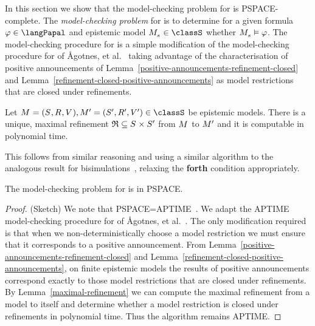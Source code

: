 In this section we show that the model-checking problem for \logicPapalS{} is PSPACE-complete.
The {\em model-checking problem} for \logicPapalS{} is to determine for a given formula $\phi \in \langPapal$ and epistemic model $\kPModel{\kStateS} \in \classS$ whether $\kPModel{\kStateS} \entails \phi$.
The model-checking procedure for \logicPapalS{} is a simple modification of the model-checking procedure for \logicApalS{} of Ågotnes, et al.~\cite{agotnesetal.jal:2010} taking advantage of the characterisation of positive announcements of Lemma~\ref{positive-announcements-refinement-closed} and Lemma~\ref{refinement-closed-positive-announcements} as model restrictions that are closed under refinements.

\begin{lemma}\label{maximal-refinement}
    Let $\kModelAndTuple, \kModelAndTuple[\prime] \in \classS$ be epistemic models.
    There is a unique, maximal refinement $\refinement \subseteq \kStates \times \kStates[\prime]$ from $\kModel$ to $\kModel[\prime]$ and it is computable in polynomial time.
\end{lemma}

This follows from similar reasoning and using a similar algorithm to the analogous result for bisimulations~\cite{gorankootto:2006}, relaxing the {\bf forth} condition appropriately.

\begin{theorem}\label{papal-model-checking-pspace}
    The model-checking problem for \logicPapalS{} is in PSPACE.
\end{theorem}

\begin{proof}{(Sketch)}
    We note that PSPACE=APTIME~\cite{CKS81}.
    We adapt the APTIME model-checking procedure for \logicApalS{} of Ågotnes, et al.~\cite{agotnesetal.jal:2010}.
    The only modification required is that when we non-deterministically choose a model restriction we must ensure that it corresponds to a positive announcement.
    From Lemma~\ref{positive-announcements-refinement-closed} and Lemma~\ref{refinement-closed-positive-announcements}, on finite epistemic models the results of positive announcements correspond exactly to those model restrictions that are closed under refinements.
    By Lemma~\ref{maximal-refinement} we can compute the maximal refinement from a model to itself and determine whether a model restriction is closed under refinements in polynomial time.
    Thus the algorithm remains APTIME.
\end{proof}

